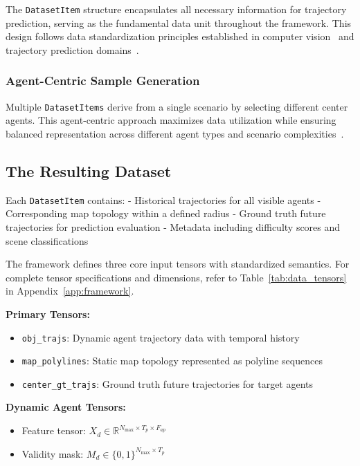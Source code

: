 The \texttt{DatasetItem} structure encapsulates all necessary information for trajectory prediction, serving as the fundamental data unit throughout the framework. This design follows data standardization principles established in computer vision~\cite{DETR2020} and trajectory prediction domains~\cite{unitrajFeng2024}.

\subsubsection{Agent-Centric Sample Generation}
\label{ssec:sample_generation}

Multiple \texttt{DatasetItems} derive from a single scenario by selecting different center agents. This agent-centric approach maximizes data utilization while ensuring balanced representation across different agent types and scenario complexities~\cite{cui2019multimodal}.



\subsection{The Resulting Dataset}
\label{ssec:tensor_definitions}

Each \texttt{DatasetItem} contains:
- Historical trajectories for all visible agents
- Corresponding map topology within a defined radius
- Ground truth future trajectories for prediction evaluation
- Metadata including difficulty scores and scene classifications

The framework defines three core input tensors with standardized semantics. For complete tensor specifications and dimensions, refer to Table~\ref{tab:data_tensors} in Appendix~\ref{app:framework}.


\textbf{Primary Tensors:}
\begin{itemize}
    \item \texttt{obj\_trajs}: Dynamic agent trajectory data with temporal history
    \item \texttt{map\_polylines}: Static map topology represented as polyline sequences
    \item \texttt{center\_gt\_trajs}: Ground truth future trajectories for target agents
\end{itemize}

\textbf{Dynamic Agent Tensors:}
\begin{itemize}
    \item Feature tensor: $X_{d} \in \mathbb{R}^{N_{\max} \times T_{p} \times F_{ap}}$
    \item Validity mask: $M_{d} \in \{0,1\}^{N_{\max} \times T_{p}}$
\end{itemize}


